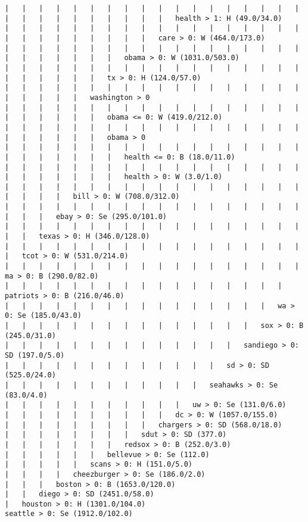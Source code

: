 \documentclass[a4paper]{article}
\begin{document}
\begin{landscape}
\begin{verbatim}
|   |   |   |   |   |   |   |   |   |   |   |   |   |   |   |   |   |   |   |   |   |   |   |   |   |   |   |   health > 1: H (49.0/34.0)
|   |   |   |   |   |   |   |   |   |   |   |   |   |   |   |   |   |   |   |   |   |   |   |   |   |   |   care > 0: W (464.0/173.0)
|   |   |   |   |   |   |   |   |   |   |   |   |   |   |   |   |   |   |   |   |   |   |   |   |   obama > 0: W (1031.0/503.0)
|   |   |   |   |   |   |   |   |   |   |   |   |   |   |   |   |   |   |   |   |   |   |   |   tx > 0: H (124.0/57.0)
|   |   |   |   |   |   |   |   |   |   |   |   |   |   |   |   |   |   |   |   |   |   |   washington > 0
|   |   |   |   |   |   |   |   |   |   |   |   |   |   |   |   |   |   |   |   |   |   |   |   obama <= 0: W (419.0/212.0)
|   |   |   |   |   |   |   |   |   |   |   |   |   |   |   |   |   |   |   |   |   |   |   |   obama > 0
|   |   |   |   |   |   |   |   |   |   |   |   |   |   |   |   |   |   |   |   |   |   |   |   |   health <= 0: B (18.0/11.0)
|   |   |   |   |   |   |   |   |   |   |   |   |   |   |   |   |   |   |   |   |   |   |   |   |   health > 0: W (3.0/1.0)
|   |   |   |   |   |   |   |   |   |   |   |   |   |   |   |   |   |   |   |   |   |   bill > 0: W (708.0/312.0)
|   |   |   |   |   |   |   |   |   |   |   |   |   |   |   |   |   |   |   |   |   ebay > 0: Se (295.0/101.0)
|   |   |   |   |   |   |   |   |   |   |   |   |   |   |   |   |   |   |   |   texas > 0: H (346.0/128.0)
|   |   |   |   |   |   |   |   |   |   |   |   |   |   |   |   |   |   |   tcot > 0: W (531.0/214.0)
|   |   |   |   |   |   |   |   |   |   |   |   |   |   |   |   |   |   ma > 0: B (290.0/82.0)
|   |   |   |   |   |   |   |   |   |   |   |   |   |   |   |   |   patriots > 0: B (216.0/46.0)
|   |   |   |   |   |   |   |   |   |   |   |   |   |   |   |   wa > 0: Se (185.0/43.0)
|   |   |   |   |   |   |   |   |   |   |   |   |   |   |   sox > 0: B (245.0/31.0)
|   |   |   |   |   |   |   |   |   |   |   |   |   |   sandiego > 0: SD (197.0/5.0)
|   |   |   |   |   |   |   |   |   |   |   |   |   sd > 0: SD (525.0/24.0)
|   |   |   |   |   |   |   |   |   |   |   |   seahawks > 0: Se (83.0/4.0)
|   |   |   |   |   |   |   |   |   |   |   uw > 0: Se (131.0/6.0)
|   |   |   |   |   |   |   |   |   |   dc > 0: W (1057.0/155.0)
|   |   |   |   |   |   |   |   |   chargers > 0: SD (568.0/18.0)
|   |   |   |   |   |   |   |   sdut > 0: SD (377.0)
|   |   |   |   |   |   |   redsox > 0: B (252.0/3.0)
|   |   |   |   |   |   bellevue > 0: Se (112.0)
|   |   |   |   |   scans > 0: H (151.0/5.0)
|   |   |   |   cheezburger > 0: Se (186.0/2.0)
|   |   |   boston > 0: B (1653.0/120.0)
|   |   diego > 0: SD (2451.0/58.0)
|   houston > 0: H (1301.0/104.0)
seattle > 0: Se (1912.0/102.0)

\end{verbatim}
\end{landscape}



\end{document}
